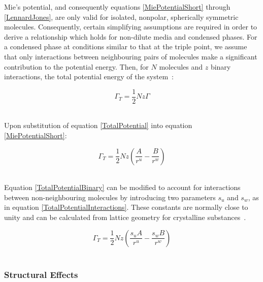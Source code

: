 Mie's potential, and consequently equations \ref{MiePotentialShort} through \ref{LennardJones}, are only valid for isolated, nonpolar, spherically symmetric molecules. Consequently, certain simplifying assumptions are required in order to derive a relationship which holds for non-dilute media and condensed phases. For a condensed phase at conditions similar to that at the triple point, we assume that only interactions between neighbouring pairs of molecules make a significant contribution to the potential energy. Then, for $N$ molecules and $z$ binary interactions, the total potential energy of the system~\cite{MolecularThermodynamicsOfFluidPhaseEquilibria}:\

\begin{equation}
\Gamma_{T} = \frac{1}{2}Nz \Gamma \label{TotalPotential}
\end{equation}\


Upon substitution of equation \ref{TotalPotential} into equation \ref{MiePotentialShort}:\

\begin{equation}
\Gamma_{T} = \frac{1}{2}Nz \left(\frac{A}{r^{u}}-\frac{B}{r^{w}}\right) \label{TotalPotentialBinary}
\end{equation}\

Equation \ref{TotalPotentialBinary} can be modified to account for interactions between non-neighbouring molecules by introducing two parameters $s_{u}$ and $s_{w}$, as in equation \ref{TotalPotentialInteractions}. These constants are normally close to unity and can be calculated from lattice geometry for crystalline substances~\cite{MolecularThermodynamicsOfFluidPhaseEquilibria}.\

\begin{equation}
\Gamma_{T} = \frac{1}{2}Nz \left(\frac{s_{u}A}{r^{u}}-\frac{s_{w}B}{r^{w}}\right) \label{TotalPotentialInteractions}
\end{equation}\


\subsubsection{Structural Effects}\

